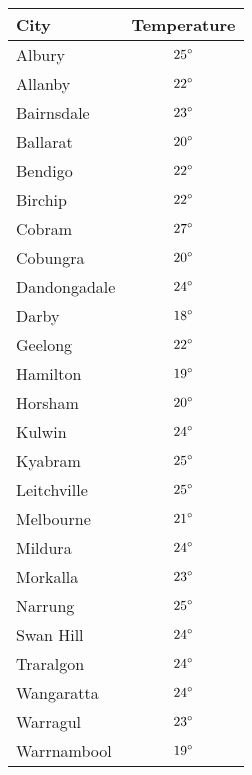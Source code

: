 \begin{tabular}{lc}            \toprule
City         & Temperature   \\\midrule
Albury       & ${25}^{\circ}$ \\
Allanby      & ${22}^{\circ}$ \\
Bairnsdale   & ${23}^{\circ}$ \\
Ballarat     & ${20}^{\circ}$ \\
Bendigo      & ${22}^{\circ}$ \\
Birchip      & ${22}^{\circ}$ \\
Cobram       & ${27}^{\circ}$ \\
Cobungra     & ${20}^{\circ}$ \\
Dandongadale & ${24}^{\circ}$ \\
Darby        & ${18}^{\circ}$ \\
Geelong      & ${22}^{\circ}$ \\
Hamilton     & ${19}^{\circ}$ \\
Horsham      & ${20}^{\circ}$ \\
Kulwin       & ${24}^{\circ}$ \\
Kyabram      & ${25}^{\circ}$ \\
Leitchville  & ${25}^{\circ}$ \\
Melbourne    & ${21}^{\circ}$ \\
Mildura      & ${24}^{\circ}$ \\
Morkalla     & ${23}^{\circ}$ \\
Narrung      & ${25}^{\circ}$ \\
Swan Hill    & ${24}^{\circ}$ \\
Traralgon    & ${24}^{\circ}$ \\
Wangaratta   & ${24}^{\circ}$ \\
Warragul     & ${23}^{\circ}$ \\
Warrnambool  & ${19}^{\circ}$ \\\bottomrule
\end{tabular}

